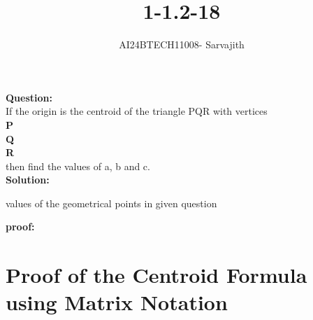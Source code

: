 \documentclass[journal]{IEEEtran}
\begin{document}

\vspace{3cm}

\title{1-1.2-18}
\author{AI24BTECH11008- Sarvajith
}
{\let\newpage\relax\maketitle}

\renewcommand{\thefigure}{\theenumi}
\renewcommand{\thetable}{\theenumi}
\setlength{\intextsep}{10pt} %
\renewcommand{\thetable}{\theenumi}
\textbf{Question: }\\
If the origin is the centroid of the triangle PQR with vertices\\
\textbf{P} \\ \textbf{Q} \\ \textbf{R}\\ then find the values of a, b and
c.\\
\textbf{Solution: }\\
\renewcommand{\tablename}{TABLE 1}
\begin{table}[h!]    
  \centering
  
  \caption{values of the geometrical points in given question}
  \label{tab1-1.2-18-1}
\end{table}
\textbf{proof: }\\


\section*{Proof of the Centroid Formula using Matrix Notation}
\end{document}
